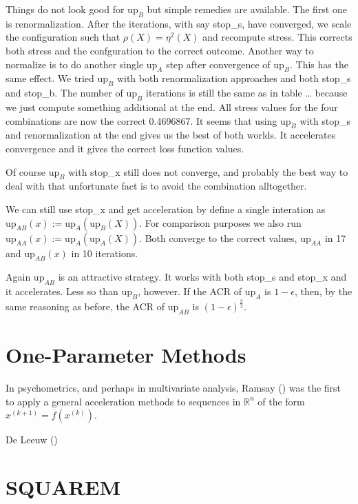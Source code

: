 \documentclass[
  12pt,
  letterpaper,
  DIV=11,
  numbers=noendperiod]{scrreprt}
\theoremstyle{remark}
\begin{document}
Things do not look good for \(\text{up}_B\) but simple remedies are
available. The first one is renormalization. After the iterations, with
say stop\_s, have converged, we scale the configuration such that
\(\rho(X)=\eta^2(X)\) and recompute stress. This corrects both stress
and the confguration to the correct outcome. Another way to normalize is
to do another single \(\text{up}_A\) step after convergence of
\(\text{up}_B\). This has the same effect. We tried \(\text{up}_B\) with
both renormalization approaches and both stop\_s and stop\_b. The number
of \(\text{up}_B\) iterations is still the same as in table \ldots{}
because we just compute something additional at the end. All stress
values for the four combinations are now the correct 0.4696867. It seems
that using \(\text{up}_B\) with stop\_s and renormalization at the end
gives us the best of both worlds. It accelerates convergence and it
gives the correct loss function values.

Of course \(\text{up}_B\) with stop\_x still does not converge, and
probably the best way to deal with that unfortunate fact is to avoid the
combination alltogether.

We can still use stop\_x and get acceleration by define a single
interation as \(\text{up}_{AB}(x):=\text{up}_A(\text{up}_B(X))\). For
comparison purposes we also run
\(\text{up}_{AA}(x):=\text{up}_A(\text{up}_A(X))\). Both converge to the
correct values, \(\text{up}_{AA}\) in 17 and \(\text{up}_{AB}(x)\) in 10
iterations.

Again \(\text{up}_{AB}\) is an attractive strategy. It works with both
stop\_s and stop\_x and it accelerates. Less so than \(\text{up}_B\),
however. If the ACR of \(\text{up}_A\) is \(1-\epsilon\), then, by the
same reasoning as before, the ACR of \(\text{up}_{AB}\) is
\((1-\epsilon)^\frac32\).

\section{One-Parameter Methods}\label{one-parameter-methods}

In psychometrics, and perhaps in multivariate analysis, Ramsay
() was the first to apply a general
acceleration methods to sequences in \(\mathbb{R}^n\) of the form
\(x^{(k+1)}=f(x^{(k)})\).

De Leeuw ()

\section{SQUAREM}\label{squarem}
\end{document}
